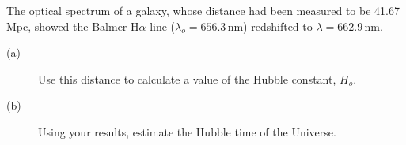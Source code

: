 The optical spectrum of a galaxy, whose distance had been measured to be
41.67\,Mpc, showed the Balmer H$\alpha$ line ($\lambda_o = 656.3$\,nm)
redshifted to $\lambda = 662.9$\,nm.
\begin{description}
\item[(a)] Use this distance to calculate a value of the Hubble constant,
  $H_o$.
\item[(b)] Using your results, estimate the Hubble time of the Universe.
\end{description}
